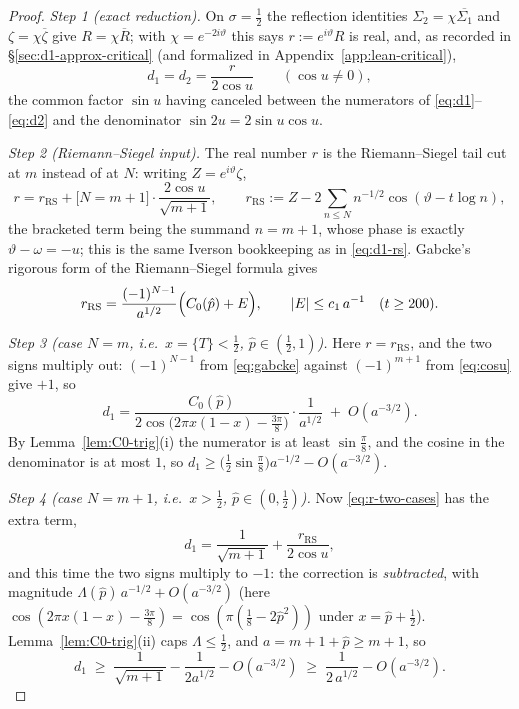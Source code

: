 \documentclass[11pt]{article}
\theoremstyle{definition}
\begin{document}
\begin{proof}
\emph{Step 1 (exact reduction).} On $\sigma=\tfrac12$ the reflection
identities $\Sigma_2=\chi\overline{\Sigma_1}$ and $\zeta=\chi\overline\zeta$
give $R=\chi\overline R$; with $\chi=e^{-2i\vartheta}$ this says
$r:=e^{i\vartheta}R$ is real, and, as recorded in
\S\ref{sec:d1-approx-critical} (and formalized in
Appendix~\ref{app:lean-critical}),
\begin{equation}\label{eq:exact-line}
d_1=d_2=\frac{r}{2\cos u}
\qquad(\cos u\neq0),
\end{equation}
the common factor $\sin u$ having canceled between the numerators of
\eqref{eq:d1}--\eqref{eq:d2} and the denominator
$\sin2u=2\sin u\cos u$.

\emph{Step 2 (Riemann--Siegel input).} The real number $r$ is the
Riemann--Siegel tail cut at $m$ instead of at $N$: writing
$Z=e^{i\vartheta}\zeta$,
\begin{equation}\label{eq:r-two-cases}
r=r_{\mathrm{RS}}+\bigl[N=m+1\bigr]\cdot\frac{2\cos u}{\sqrt{m+1}},
\qquad
r_{\mathrm{RS}}:=Z-2\!\!\sum_{n\leq N}\!n^{-1/2}\cos(\vartheta-t\log n),
\end{equation}
the bracketed term being the summand $n=m+1$, whose phase is exactly
$\vartheta-\omega=-u$; this is the same Iverson bookkeeping as in
\eqref{eq:d1-rs}. Gabcke's rigorous form of the Riemann--Siegel formula
\cite{Gabcke1979} gives
\begin{equation}\label{eq:gabcke}
r_{\mathrm{RS}}=\frac{(-1)^{N-1}}{a^{1/2}}\Bigl(C_0(\hat p)+E\Bigr),
\qquad |E|\leq c_1\,a^{-1}\quad(t\geq200).
\end{equation}

\emph{Step 3 (case $N=m$, i.e.\ $x=\{T\}<\tfrac12$,
$\hat p\in(\tfrac12,1)$).} Here $r=r_{\mathrm{RS}}$, and the two signs
multiply out: $(-1)^{N-1}$ from \eqref{eq:gabcke} against $(-1)^{m+1}$ from
\eqref{eq:cosu} give $+1$, so
\[
d_1=\frac{C_0(\hat p)}
{2\cos\bigl(2\pi x(1-x)-\tfrac{3\pi}8\bigr)}\cdot\frac{1}{a^{1/2}}
\;+\;O(a^{-3/2}).
\]
By Lemma~\ref{lem:C0-trig}(i) the numerator is at least $\sin\tfrac\pi8$,
and the cosine in the denominator is at most $1$, so
$d_1\geq\bigl(\tfrac12\sin\tfrac\pi8\bigr)a^{-1/2}-O(a^{-3/2})$.

\emph{Step 4 (case $N=m+1$, i.e.\ $x>\tfrac12$,
$\hat p\in(0,\tfrac12)$).} Now \eqref{eq:r-two-cases} has the extra term,
\[
d_1=\frac1{\sqrt{m+1}}+\frac{r_{\mathrm{RS}}}{2\cos u},
\]
and this time the two signs multiply to $-1$: the correction is
\emph{subtracted}, with magnitude $\Lambda(\hat p)\,a^{-1/2}+O(a^{-3/2})$
(here $\cos(2\pi x(1-x)-\tfrac{3\pi}8)=\cos(\pi(\tfrac18-2\hat p^{2}))$
under $x=\hat p+\tfrac12$). Lemma~\ref{lem:C0-trig}(ii) caps
$\Lambda\leq\tfrac12$, and $a=m+1+\hat p\geq m+1$, so
\[
d_1\;\geq\;\frac1{\sqrt{m+1}}-\frac{1}{2a^{1/2}}-O(a^{-3/2})
\;\geq\;\frac{1}{2\,a^{1/2}}-O(a^{-3/2}).
\]


\end{proof}
\end{document}

